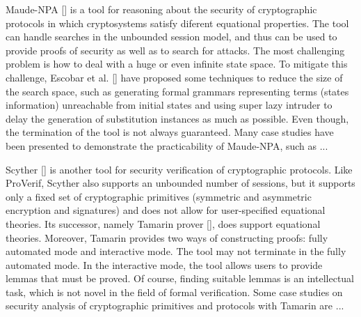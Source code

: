 \documentclass[a4paper,fleqn]{cas-dc}
\begin{document}
Maude-NPA [\cite{maudenpa}] is a tool for reasoning about the security of cryptographic protocols in which cryptosystems satisfy diferent equational properties.
The tool can handle searches in the unbounded session model, and thus can be used to provide proofs of security as well as to search for attacks.
The most challenging problem is how to deal with a huge or even infinite state space.
To mitigate this challenge, Escobar et al. [\cite{maudenpa08}] have proposed some techniques to reduce the size of the search space, such as generating formal grammars representing terms (states information) unreachable from initial states and using super lazy intruder to delay the generation of substitution instances as much as possible.
Even though, the termination of the tool is not always guaranteed.
Many case studies have been presented to demonstrate the practicability of Maude-NPA, such as ...

Scyther [\cite{Scyther08}] is another tool for security verification of cryptographic protocols.
Like ProVerif, Scyther also supports an unbounded number of sessions, but it supports only a fixed set of cryptographic primitives (symmetric and asymmetric encryption and signatures) and does not allow for user-specified equational theories.
Its successor, namely Tamarin prover [\cite{tamarin}], does support equational theories.
Moreover, Tamarin  provides two ways of constructing proofs: fully automated mode and interactive mode. 
The tool may not terminate in the fully automated mode.
In the interactive mode, the tool allows users to provide lemmas that must be proved. 
Of course, finding suitable lemmas is an intellectual task, which is not novel in the field of formal verification.
Some case studies on security analysis of cryptographic primitives and protocols with Tamarin are ...
\end{document}
